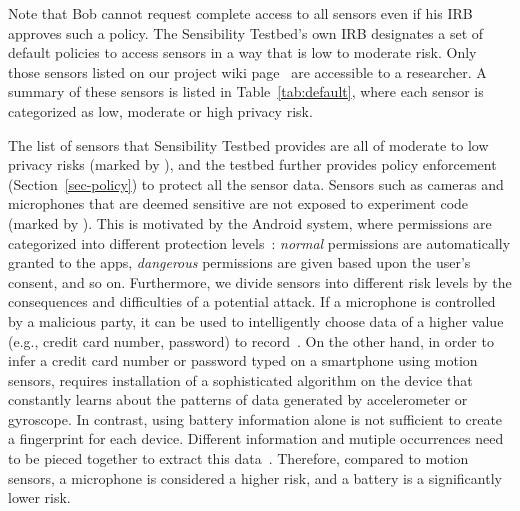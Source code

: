 Note that Bob cannot request complete access to all sensors 
even if his IRB approves such a policy. The Sensibility Testbed's
own IRB designates a set of default policies to access sensors in a
way that is low to moderate risk. 
Only those sensors listed on our project 
wiki page~\cite{sensor-api} are accessible to a researcher. 
A summary of these sensors is listed in Table~\ref{tab:default}, 
where each sensor is categorized as low, moderate or high 
privacy risk.

The list of sensors that Sensibility Testbed provides are all of moderate 
to low privacy risks (marked by \tickmark), and the testbed further provides policy enforcement
(Section~\ref{sec-policy}) to protect all the sensor data. Sensors 
such as cameras and microphones that are deemed sensitive are not 
exposed to experiment code (marked by \xmark). This is motivated by the Android system, 
where permissions are categorized into different protection levels~\cite{level}:
\textit{normal} permissions are automatically granted to the apps, 
\textit{dangerous} permissions are given based upon the 
user's consent, and so on. Furthermore, 
we divide sensors into different risk levels by the consequences and 
difficulties of a potential attack. If a microphone is controlled by 
a malicious party, it can be used to intelligently choose data of a 
higher value (e.g., credit card number, password) to record~\cite{zhang2015leave}. On the other 
hand, in order to infer a credit card number or password typed on a 
smartphone using motion sensors, requires installation of a sophisticated algorithm on the device that constantly learns about  
the patterns of data generated by accelerometer or gyroscope. In contrast,
using battery information alone is not sufficient to create a fingerprint 
for each device. Different information and mutiple occurrences need to
be pieced together to extract this data~\cite{battery-priv}. Therefore, 
compared to motion sensors, a microphone is considered a higher risk, 
and a battery is a significantly lower risk.

